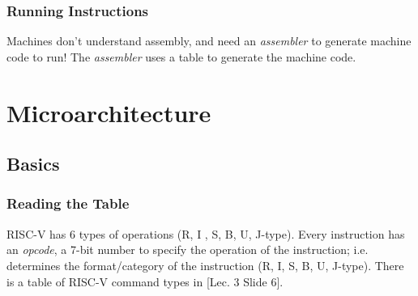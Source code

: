 \documentclass{report}
\begin{document}
\subsection{Running Instructions}
Machines don't understand assembly, and need an \textit{assembler} to generate machine code to run!
The \textit{assembler} uses a table to generate the machine code.





\chapter{Microarchitecture}

\section{Basics}
\subsection{Reading the Table}
RISC-V has 6 types of operations (R, I , S, B, U, J-type). Every instruction has an \textit{opcode},
a 7-bit number to specify the operation of the instruction; i.e. determines the format/category of
the instruction (R, I, S, B, U, J-type).
\newline
\newline
There is a table of RISC-V command types in [Lec. 3 Slide 6].
\end{document}
